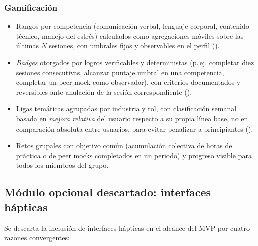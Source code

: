 \subsubsection{Gamificación}
\begin{itemize}
  \item Rangos por competencia (comunicación verbal, lenguaje
        corporal, contenido técnico, manejo del estrés) calculados
        como agregaciones móviles sobre las últimas $N$ sesiones, con
        umbrales fijos y observables en el perfil ().
  \item \textit{Badges} otorgados por logros verificables y
        deterministas (p.\,ej. completar diez sesiones consecutivas,
        alcanzar puntaje umbral en una competencia, completar un peer
        mock como observador), con criterios documentados y reversibles
        ante anulación de la sesión correspondiente ().
  \item Ligas temáticas agrupadas por industria y rol, con
        clasificación semanal basada en \emph{mejora relativa} del
        usuario respecto a su propia línea base, no en comparación
        absoluta entre usuarios, para evitar penalizar a principiantes
        ().
  \item Retos grupales con objetivo común (acumulación colectiva de
        horas de práctica o de peer mocks completados en un periodo) y
        progreso visible para todos los miembros del grupo.
\end{itemize}

\subsection{Módulo opcional descartado: interfaces hápticas}

Se descarta la inclusión de interfaces hápticas en el alcance del MVP
por cuatro razones convergentes:

